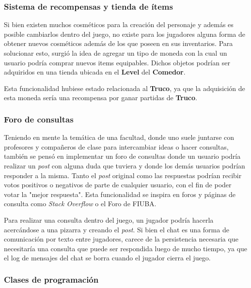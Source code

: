 \subsubsection{Sistema de recompensas y tienda de ítems}

\noindent Si bien existen muchos cosméticos para la creación del personaje y además es posible cambiarlos dentro del
juego, no existe para los jugadores alguna forma de obtener nuevos cosméticos además de los que poseen en sus
inventarios. Para solucionar esto, surgió la idea de agregar un tipo de moneda con la cual un usuario podría comprar nuevos
items equipables. Dichos objetos podrían ser adquiridos en una tienda ubicada en el \textbf{Level} del \textbf{Comedor}.

Esta funcionalidad hubiese estado relacionada al \textbf{Truco}, ya que la adquisición de esta moneda
sería una recompensa por ganar partidas de \textbf{Truco}.

\subsubsection{Foro de consultas}

\noindent Teniendo en mente la temática de una facultad, donde uno suele juntarse con profesores y compañeros de clase
para intercambiar ideas o hacer consultas, también se pensó en implementar un foro de consultas donde un usuario
podría realizar un \textit{post} con alguna duda que tuviera y donde los demás usuarios podrían responder a la misma. Tanto el \textit{post}
original como las respuestas podrían recibir votos positivos o negativos de parte de cualquier usuario, con el fin
de poder votar la "mejor respuesta". Esta funcionalidad se inspira en foros y páginas de consulta como \textit{Stack Overflow} o el Foro de FIUBA.

Para realizar una consulta dentro del juego, un jugador podría hacerla acercándose a una pizarra y creando el \textit{post}.
Si bien el chat es una forma de comunicación por texto entre jugadores, carece de la persistencia necesaria que necesitaría
una consulta que puede ser respondida luego de mucho tiempo, ya que el log de mensajes del chat se borra cuando el jugador
cierra el juego.

\subsubsection{Clases de programación}

